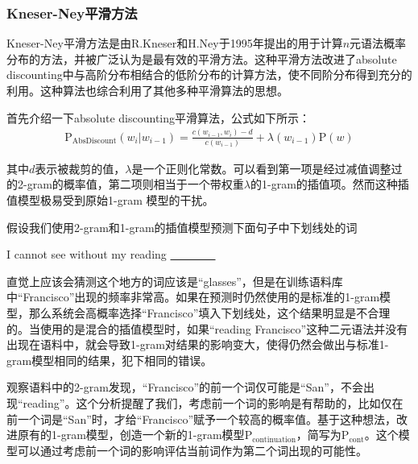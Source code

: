 
\subsubsection{Kneser-Ney平滑方法}

\parinterval Kneser-Ney平滑方法是由R.Kneser和H.Ney于1995年提出的用于计算$n$元语法概率分布的方法\cite{kneser1995improved}\cite{chen1999empirical}，并被广泛认为是最有效的平滑方法。这种平滑方法改进了absolute discounting中与高阶分布相结合的低阶分布的计算方法，使不同阶分布得到充分的利用。这种算法也综合利用了其他多种平滑算法的思想。

\parinterval 首先介绍一下absolute discounting平滑算法，公式如下所示：
\begin{eqnarray}
\textrm{P}_{\textrm{AbsDiscount}}(w_i | w_{i-1}) = \frac{c(w_{i-1},w_i )-d}{c(w_{i-1})} + \lambda(w_{i-1})\textrm{P}(w)
\label{eq:2-33}
\end{eqnarray}

\noindent 其中$d$表示被裁剪的值，$\lambda$是一个正则化常数。可以看到第一项是经过减值调整过的2-gram的概率值，第二项则相当于一个带权重$\lambda$的1-gram的插值项。然而这种插值模型极易受到原始1-gram 模型的干扰。

\parinterval 假设我们使用2-gram和1-gram的插值模型预测下面句子中下划线处的词

\vspace{0.0em}
\begin{center}
I cannot see without my reading \underline{\ \ \ \ \ \ \ \ }
\end{center}
\vspace{0.0em}

\noindent 直觉上应该会猜测这个地方的词应该是``glasses''，但是在训练语料库中``Francisco''出现的频率非常高。如果在预测时仍然使用的是标准的1-gram模型，那么系统会高概率选择``Francisco''填入下划线处，这个结果明显是不合理的。当使用的是混合的插值模型时，如果``reading Francisco''这种二元语法并没有出现在语料中，就会导致1-gram对结果的影响变大，使得仍然会做出与标准1-gram模型相同的结果，犯下相同的错误。

\parinterval 观察语料中的2-gram发现，``Francisco''的前一个词仅可能是``San''，不会出现``reading''。这个分析提醒了我们，考虑前一个词的影响是有帮助的，比如仅在前一个词是``San''时，才给``Francisco''赋予一个较高的概率值。基于这种想法，改进原有的1-gram模型，创造一个新的1-gram模型$\textrm{P}_{\textrm{continuation}}$，简写为$\textrm{P}_{\textrm{cont}}$。这个模型可以通过考虑前一个词的影响评估当前词作为第二个词出现的可能性。

